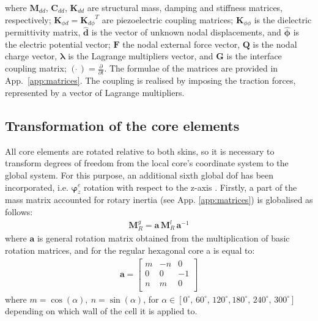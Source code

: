 \documentclass[a4paper,fleqn]{cas-sc}
\begin{document}
where \(\textbf{M}_{dd}\), \(\textbf{C}_{dd}\), \(\textbf{K}_{dd}\) are structural mass, damping and stiffness matrices, respectively; \(\textbf{K}_{\phi d}={\textbf{K}_{d\phi}}^T\) are piezoelectric coupling matrices; \(\textbf{K}_{\phi \phi}\) is the dielectric permittivity matrix, \(\widehat{\textbf{d}}\) is the vector of unknown nodal displacements, and \(\widehat{\boldsymbol{\phi}}\) is the electric potential vector; \(\textbf{F}\) the nodal external force vector, \(\textbf{Q}\) is the nodal charge vector, \(\boldsymbol{\lambda}\) is the Lagrange multipliers vector, and \(\textbf{G}\) is the interface coupling matrix; \((\dot{\ })=\frac{\partial}{\partial t}\).
The formulae of the matrices are provided in App.~\ref{app:matrices}.
The coupling is realised by imposing the traction forces, represented by a vector of Lagrange multipliers. 
\subsection{Transformation of the core elements}
\label{sec:transformation}
All core elements are rotated relative to both skins, so it is necessary to transform degrees of freedom from the local core's coordinate system to the global system.
For this purpose, an additional sixth global dof has been incorporated, i.e. $\boldsymbol{\varphi}_z^e$ rotation with respect to the z-axis .
Firstly, a part of the mass matrix accounted for rotary inertia (see App. \ref{app:matrices}) is globalised as follows:
\begin{eqnarray}
	\textbf{M}_R^g=\textbf{a}\,\textbf{M}_R^l\,\textbf{a}^{-1}
	\label{eq:inertia}
\end{eqnarray}
where \(\textbf{a}\) is general rotation matrix obtained from the multiplication of basic rotation matrices, and for the regular hexagonal core a is equal to:
\begin{eqnarray}
	\textbf{a}=\left [ 
	\begin{array}{ccc}
		m & -n & 0\\
		0 & 0 & -1\\
		n & m & 0\\
	\end{array}
	\right ]
	\label{eq:rotation}
\end{eqnarray}
where \(m=\cos(\alpha),\:n=\sin(\alpha)\), for \(\alpha\in{[0^\circ,\,60^\circ,\,120^\circ,180^\circ,\,240^\circ,\,300^\circ]}\) depending on which wall of the cell it is applied to.
\end{document}
